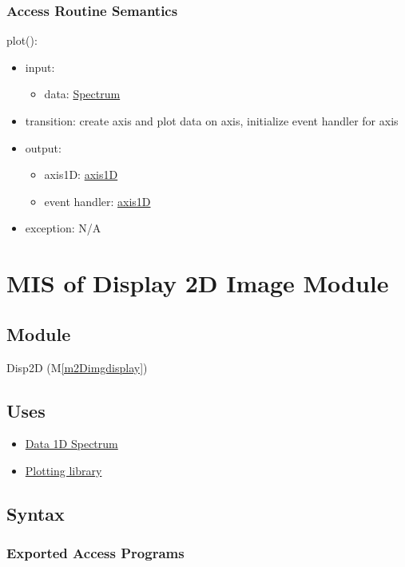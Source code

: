 \documentclass[12pt, titlepage]{article}
\newcommand{\mref}[1]{M\ref{#1}}
\begin{document}
\subsubsection{Access Routine Semantics}

\noindent plot():
\begin{itemize}
    \item input:
    \begin{itemize}
        \item data: \hyperref[Mod:Spectrum]{Spectrum}
    \end{itemize}
    \item transition: create axis and plot data on axis, initialize event
    handler for axis
    \item output:
    \begin{itemize}
        \item axis1D: \hyperref[Mod:Plotting]{axis1D}
        \item event handler: \hyperref[Mod:Plotting]{axis1D}
    \end{itemize}
    \item exception: N/A
\end{itemize}

\section{MIS of Display 2D Image Module} \label{Mod:Disp2D}

\subsection{Module}

Disp2D (\mref{m2Dimgdisplay})

\subsection{Uses}
\begin{itemize}
    \item \hyperref[Mod:Spectrum]{Data 1D Spectrum}
    \item \hyperref[Mod:Plotting]{Plotting library}
\end{itemize}

\subsection{Syntax}

\subsubsection{Exported Access Programs}
\end{document}
